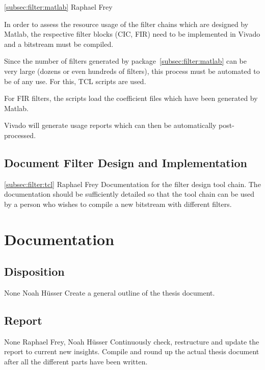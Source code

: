 \documentclass[a4paper,oneside]{alpenspecs/alpenspecs}
\begin{document}
\wpac
    {}
    {}
    {}
    {\ref{subsec:filter:matlab}}
    {}
    {Raphael Frey}
    {%
    In order to assess the resource usage of the filter chains which are
    designed by Matlab, the respective filter blocks (CIC, FIR) need to be
    implemented in Vivado and a bitstream must be compiled.

    Since the number of filters generated by package~\ref{subsec:filter:matlab}
    can be very large (dozens or even hundreds of filters), this process must be automated
    to be of any use. For this, TCL scripts are used.

    For FIR filters, the scripts load the coefficient files which have been
    generated by Matlab.

    Vivado will  generate usage  reports which  can then  be automatically
    post-processed.
    }


\subsection{Document Filter Design and Implementation}
\label{subsec:filter:doc}

\wpac
    {}
    {}
    {}
    {\ref{subsec:filter:tcl}}
    {}
    {Raphael Frey}
    {%
        Documentation  for the  filter design  tool chain. The  documentation
        should be sufficiently detailed so that the tool chain can be used by
        a  person  who wishes  to  compile  a  new bitstream  with  different
        filters.
    }


\section{Documentation}
\label{sec:docs}

\subsection{Disposition}
\wpac
    {}
    {}
    {}
    {None}
    {}
    {Noah H\"usser}
    {%
    Create a general outline of the thesis document.%
    }

\subsection{Report}
\wpac
    {}
    {}
    {}
    {None}
    {}
    {Raphael Frey, Noah H\"usser}
    {%
    Continuously check, restructure and update the report to current new insights.
    Compile and round up the actual thesis document after all the different parts have been written.%
    }
\end{document}

